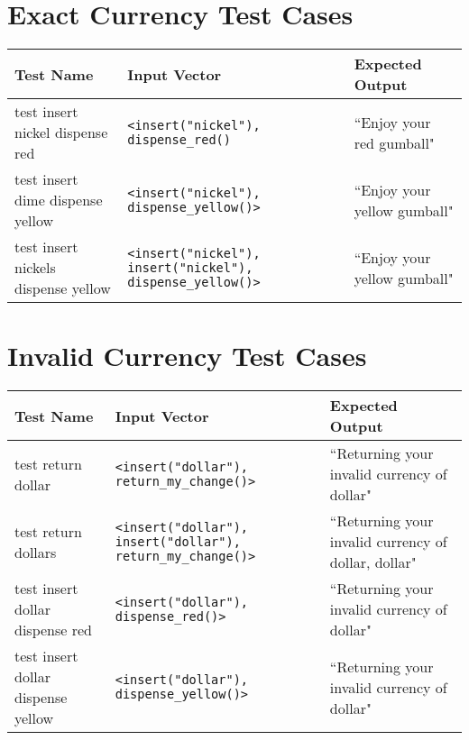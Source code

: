 \documentclass[10pt,letterpaper]{article}
\begin{document}
\section{Exact Currency Test Cases}
\begin{table}[!htb]
\begin{tabularx}{\textwidth}{XXX}
\toprule
Test Name &
    Input Vector &
    Expected Output \\ \midrule
test insert nickel dispense red &
    \texttt{<insert("nickel"), dispense\_red()} &
    ``Enjoy your red gumball" \\ \midrule
test insert dime dispense yellow &
    \texttt{<insert("nickel"), dispense\_yellow()>} &
    ``Enjoy your yellow gumball" \\ \midrule
test insert nickels dispense yellow &
    \texttt{<insert("nickel"), insert("nickel"), dispense\_yellow()>} &
    ``Enjoy your yellow gumball" \\ \bottomrule
\end{tabularx}
\end{table}

\section{Invalid Currency Test Cases}
\begin{table}[!htb]
\begin{tabularx}{\textwidth}{XXX}
\toprule
Test Name &
    Input Vector &
    Expected Output \\ \midrule
test return dollar &
    \texttt{<insert("dollar"), return\_my\_change()>} &
    ``Returning your invalid currency of dollar" \\ \midrule
test return dollars &
    \texttt{<insert("dollar"), insert("dollar"), return\_my\_change()>} &
    ``Returning your invalid currency of dollar, dollar" \\ \midrule
test insert dollar dispense red &
    \texttt{<insert("dollar"), dispense\_red()>} &
    ``Returning your invalid currency of dollar" \\ \midrule
test insert dollar dispense yellow &
    \texttt{<insert("dollar"), dispense\_yellow()>} &
    ``Returning your invalid currency of dollar" \\ \bottomrule
\end{tabularx}
\end{table}
\end{document}
